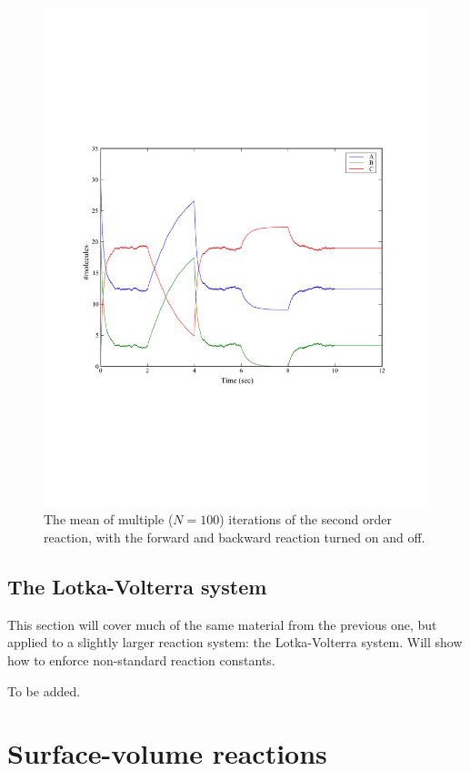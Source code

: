 \documentclass[a4paper,12pt]{book}
\begin{document}
\begin{figure}
\centering
\includegraphics[width=13cm]{chap02_secondorderreaction08.pdf}
\caption{The mean of multiple ($N=100$) iterations of the second order reaction, with the forward and backward reaction turned on and off.}
\label{fig:chap02:secondorderreaction08}
\end{figure}

\section{The Lotka-Volterra system}

This section will cover much of the same material from the previous one, but applied to a slightly larger reaction system: the Lotka-Volterra system. Will show how to enforce non-standard reaction constants.

To be added.

\chapter{Surface-volume reactions}
\end{document}

